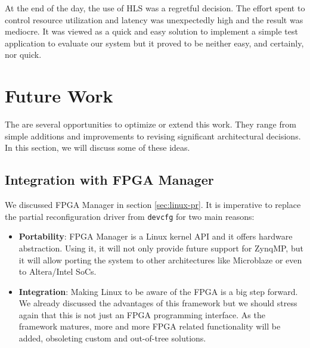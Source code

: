 
At the end of the day, the use of HLS was a regretful decision.
The effort spent to control resource utilization and latency was unexpectedly high and the result was mediocre.
It was viewed as a quick and easy solution to implement a simple test application to evaluate our system 
but it proved to be neither easy, and certainly, nor quick.

\section{Future Work}

The are several opportunities to optimize or extend this work.
They range from simple additions and improvements to 
revising significant architectural decisions.
In this section, we will discuss some of these ideas.

\subsection{Integration with FPGA Manager}

We discussed FPGA Manager in section \ref{sec:linux-pr}. 
It is imperative to replace the partial reconfiguration driver from \texttt{devcfg} for two main reasons:

\begin{itemize}
\item	\textbf{Portability}: FPGA Manager is a Linux kernel API and it offers hardware abstraction. 
	Using it, it will not only provide future support for ZynqMP, but it will allow porting the system
	to other architectures like Microblaze or even to Altera/Intel SoCs.
\item	\textbf{Integration}: Making Linux to be aware of the FPGA is a big step forward.
	We already discussed the advantages of this framework but we should stress again that this is not just
	an FPGA programming interface. 
	As the framework matures, more and more FPGA related functionality will be added, 
	obsoleting custom and out-of-tree solutions.
\end{itemize}

